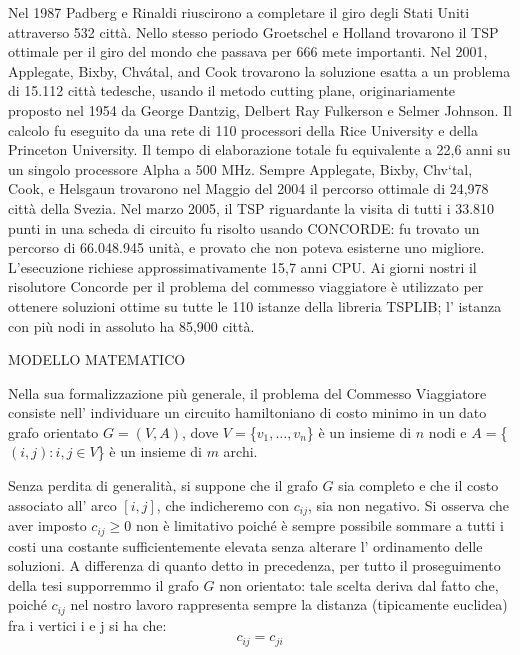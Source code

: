 \documentclass[11pt]{article}
\begin{document}
Nel 1987  Padberg e Rinaldi riuscirono a completare il giro degli Stati Uniti attraverso 532 citt\`a. Nello stesso periodo Groetschel e Holland trovarono il TSP ottimale per il giro del mondo che passava per 666 mete importanti. 
Nel 2001, Applegate, Bixby, Chvátal, and Cook trovarono la soluzione esatta a un problema di 15.112 citt\`a tedesche, usando il metodo cutting plane, originariamente proposto nel 1954 da George Dantzig, Delbert Ray Fulkerson e Selmer Johnson. Il calcolo fu eseguito da una rete di 110 processori della Rice University e della Princeton University. Il tempo di elaborazione totale fu equivalente a 22,6 anni su un singolo processore Alpha a 500 MHz.
Sempre Applegate, Bixby, Chv\a`tal, Cook, e Helsgaun trovarono nel Maggio del 2004 il percorso ottimale di 24,978 citt\`a della Svezia. 
Nel marzo 2005, il TSP riguardante la visita di tutti i 33.810 punti in una scheda di circuito fu risolto usando CONCORDE: fu trovato un percorso di 66.048.945 unit\`a, e provato che non poteva esisterne uno migliore. L'esecuzione richiese approssimativamente 15,7 anni CPU. 
Ai giorni nostri il risolutore Concorde per il problema del commesso viaggiatore \`e utilizzato per ottenere soluzioni ottime su tutte le 110 istanze della libreria TSPLIB; l' istanza con pi\`u nodi in assoluto ha 85,900 citt\`a. 

\vspace{2\baselineskip}

MODELLO MATEMATICO
\vspace{2\baselineskip}

Nella sua formalizzazione pi\`u generale, il problema del Commesso Viaggiatore consiste nell' individuare un circuito hamiltoniano di costo minimo in un dato grafo orientato $G=(V,A)$, dove $V = $\{$ {v_1,\dots,v_n} $\}$ $ \`e un insieme di $n$ nodi e $A = $\{$ {(i,j): i, j \in V} $\}$ $ \`e un insieme di $m$ archi. 

Senza perdita di generalit\`a, si suppone che il grafo $G$ sia completo e che il costo associato all' arco $[i,j]$, che indicheremo con $c_{ij}$, sia non negativo. Si osserva che aver imposto $c_{ij} \ge 0$ non \`e limitativo poich\'e \`e sempre possibile sommare a tutti i costi una costante sufficientemente elevata senza alterare l' ordinamento delle soluzioni. 
A differenza di quanto detto in precedenza, per tutto il proseguimento della tesi supporremmo il grafo $G$ non orientato: tale scelta deriva dal fatto che, poich\'e $c_{ij}$ nel nostro lavoro rappresenta sempre la distanza (tipicamente euclidea) fra i vertici i e j si ha che:
$$c_{ij} = c_{ji}$$
\end{document}
